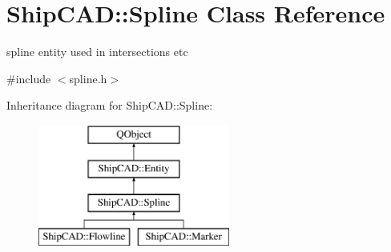 \hypertarget{classShipCAD_1_1Spline}{}\section{Ship\+C\+AD\+:\+:Spline Class Reference}
\label{classShipCAD_1_1Spline}


spline entity used in intersections etc  




{\ttfamily \#include $<$spline.\+h$>$}

Inheritance diagram for Ship\+C\+AD\+:\+:Spline\+:\begin{figure}[H]
\begin{center}
\leavevmode
\includegraphics[height=4.000000cm]{classShipCAD_1_1Spline}
\end{center}
\end{figure}
